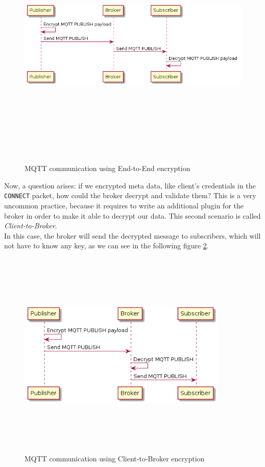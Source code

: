 \documentclass[12pt]{report}
\begin{document}
{{\begin{figure}[H]
\includegraphics[width=12.5cm,height=12cm,keepaspectratio]{end_to_end}
\centering
\caption{MQTT communication using End-to-End encryption}
\label{fig:endtoend}
\end{figure}

Now, a question arises: if we encrypted meta data, like client's credentials in the \texttt{CONNECT} packet, how could the broker decrypt and validate them?
This is a very uncommon practice, because it requires to write an additional plugin for the broker in order to make it able to decrypt our data. 
This second scenario is called \emph{Client-to-Broker}.\\
In this case, the broker will send the decrypted message to subscribers, which will not have to know any key, as we can see in the following figure \ref{fig:mqttclienttobroker}.

\begin{figure}[H]
\includegraphics[width=10cm,height=10cm,keepaspectratio]{client_to_broker}
\centering
\caption{MQTT communication using Client-to-Broker encryption}
\label{fig:mqttclienttobroker}
\end{figure}

}}
\end{document}
